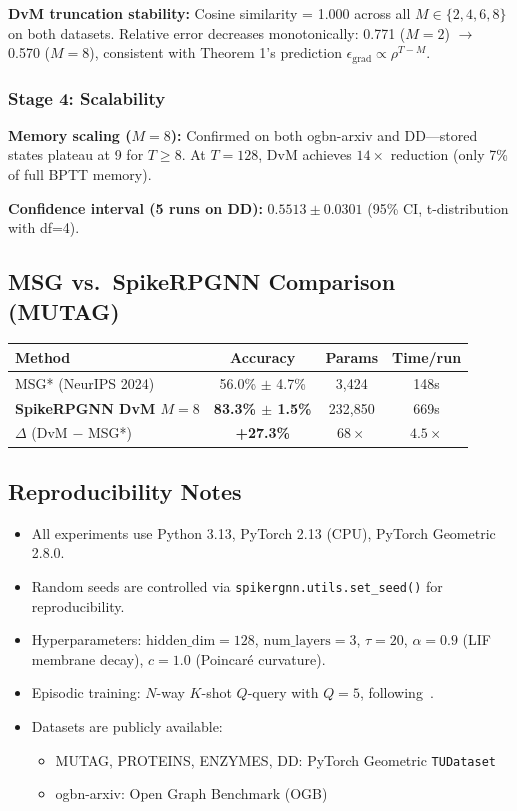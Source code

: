 \documentclass[a4paper,11pt]{article}
\begin{document}
\textbf{DvM truncation stability:} Cosine similarity = 1.000 across all $M \in \{2,4,6,8\}$ on both datasets. Relative error decreases monotonically: 0.771 ($M{=}2$) $\to$ 0.570 ($M{=}8$), consistent with Theorem 1's prediction $\epsilon_{\text{grad}} \propto \rho^{T-M}$.

\subsubsection*{Stage 4: Scalability}

\textbf{Memory scaling ($M{=}8$):} Confirmed on both ogbn-arxiv and DD---stored states plateau at 9 for $T \geq 8$. At $T{=}128$, DvM achieves $14\times$ reduction (only 7\% of full BPTT memory).

\textbf{Confidence interval (5 runs on DD):} $0.5513 \pm 0.0301$ (95\% CI, t-distribution with df=4).

\subsection{MSG vs.\ SpikeRPGNN Comparison (MUTAG)}

\begin{center}
\begin{tabular}{lccc}
\toprule
\textbf{Method} & \textbf{Accuracy} & \textbf{Params} & \textbf{Time/run} \\
\midrule
MSG* (NeurIPS 2024) & 56.0\% $\pm$ 4.7\% & 3,424 & 148s \\
\textbf{SpikeRPGNN DvM $M{=}8$} & \textbf{83.3\% $\pm$ 1.5\%} & 232,850 & 669s \\
\midrule
$\Delta$ (DvM $-$ MSG*) & \textbf{+27.3\%} & $68\times$ & $4.5\times$ \\
\bottomrule
\end{tabular}
\end{center}

\subsection{Reproducibility Notes}

\begin{itemize}
    \item All experiments use Python 3.13, PyTorch 2.13 (CPU), PyTorch Geometric 2.8.0.
    \item Random seeds are controlled via \texttt{spikergnn.utils.set\_seed()} for reproducibility.
    \item Hyperparameters: $\text{hidden\_dim}=128$, $\text{num\_layers}=3$, $\tau=20$, $\alpha=0.9$ (LIF membrane decay), $c=1.0$ (Poincar\'e curvature).
    \item Episodic training: $N$-way $K$-shot $Q$-query with $Q=5$, following~\citep{Snell17}.
    \item Datasets are publicly available:
    \begin{itemize}
        \item MUTAG, PROTEINS, ENZYMES, DD: PyTorch Geometric \texttt{TUDataset}
        \item ogbn-arxiv: Open Graph Benchmark (OGB)
    \end{itemize}
\end{itemize}
\end{document}
